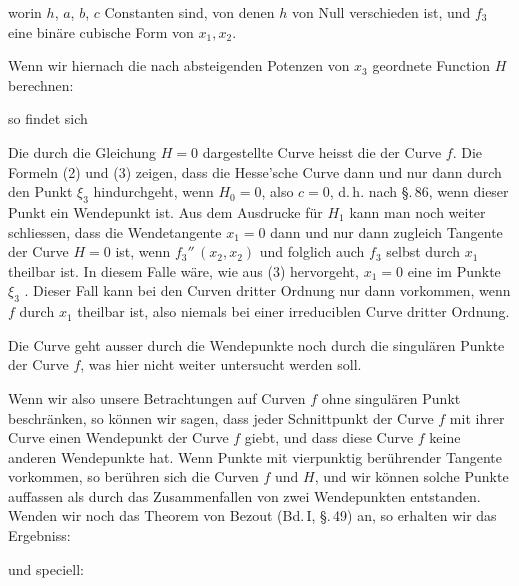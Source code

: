 worin $h$, $a$, $b$, $c$ Constanten sind, von denen $h$ von Null verschieden
 ist, und $f_3$ eine binäre cubische Form von $x_1, x_2$.

Wenn wir hiernach die nach absteigenden Potenzen von $x_3$
geordnete Function $H$ berechnen:


so findet sich


Die durch die Gleichung $H=0$ dargestellte Curve heisst
die  der Curve $f$. Die Formeln (2) und (3)
zeigen, dass die Hesse'sche Curve dann und nur dann durch den
Punkt $\xi_3$ hindurchgeht, wenn $H_0=0$, also $c=0$, d.\,h. nach \S.\,86,
wenn dieser Punkt ein Wendepunkt ist. Aus dem Ausdrucke
für $H_1$ kann man noch weiter schliessen, dass die Wendetangente
$x_1=0$ dann und nur dann zugleich Tangente der Curve $H=0$
ist, wenn $f_3''\,(x_2,x_2)$ und folglich auch $f_3$ selbst durch $x_1$ theilbar
ist. In diesem Falle wäre, wie aus (3) hervorgeht, $x_1=0$ eine
im Punkte $\xi_3$ . Dieser
Fall kann bei den Curven dritter Ordnung nur dann vorkommen,
wenn $f$ durch $x_1$ theilbar ist, also niemals bei einer irreduciblen
Curve dritter Ordnung.

Die  Curve geht ausser durch die Wendepunkte
noch durch die singulären Punkte der Curve $f$, was hier nicht
weiter untersucht werden soll.

Wenn wir also unsere Betrachtungen auf Curven $f$ ohne
singulären Punkt beschränken, so können wir sagen, dass jeder
Schnittpunkt der Curve $f$ mit ihrer  Curve einen
Wendepunkt der Curve $f$ giebt, und dass diese Curve $f$ keine
anderen Wendepunkte hat. Wenn Punkte mit vierpunktig berührender
 Tangente vorkommen, so berühren sich die Curven $f$
und $H$, und wir können solche Punkte auffassen als durch das
Zusammenfallen von zwei Wendepunkten entstanden. Wenden
wir noch das Theorem von Bezout (Bd.\,I, \S.\,49) an, so erhalten
wir das Ergebniss:

\begin{quote}
\end{quote}

und speciell:

\begin{quote}
\end{quote}
